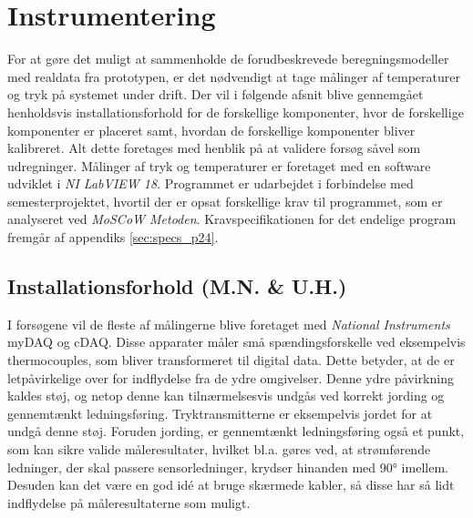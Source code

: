 \documentclass[../Hovedrapport.tex]{subfiles}
\begin{document}

\chapter{Instrumentering}
    \label{sec:instrumentering}

For at gøre det muligt at sammenholde de forudbeskrevede beregningsmodeller med realdata fra prototypen, er det nødvendigt at tage målinger af temperaturer og tryk på systemet under drift. 
Der vil i følgende afsnit blive gennemgået henholdsvis installationsforhold for de forskellige komponenter, hvor de forskellige komponenter er placeret samt, hvordan de forskellige komponenter bliver kalibreret. Alt dette foretages med henblik på at validere forsøg såvel som udregninger. Målinger af tryk og temperaturer er foretaget med en software udviklet i \textit{NI LabVIEW 18}. Programmet er udarbejdet i forbindelse med semesterprojektet, hvortil der er opsat forskellige krav til programmet, som er analyseret ved \textit{MoSCoW Metoden}. Kravspecifikationen for det endelige program fremgår af appendiks \ref{sec:specs_p24}.
\section{Installationsforhold (M.N. \& U.H.)}   
I forsøgene vil de fleste af målingerne blive foretaget med \textit{National Instruments} myDAQ og cDAQ. Disse apparater måler små spændingsforskelle ved eksempelvis thermocouples, som bliver transformeret til digital data. Dette betyder, at de er letpåvirkelige over for indflydelse fra de ydre omgivelser. Denne ydre påvirkning kaldes støj, og netop denne kan tilnærmelsesvis undgås ved korrekt jording og gennemtænkt ledningsføring. Tryktransmitterne er eksempelvis jordet for at undgå denne støj. Foruden jording, er gennemtænkt ledningsføring også et punkt, som kan sikre valide måleresultater, hvilket bl.a. gøres ved, at strømførende ledninger, der skal passere sensorledninger, krydser hinanden med 90\si{\degree} imellem. Desuden kan det være en god idé at bruge skærmede kabler, så disse har så lidt indflydelse på måleresultaterne som muligt. 
\end{document}
